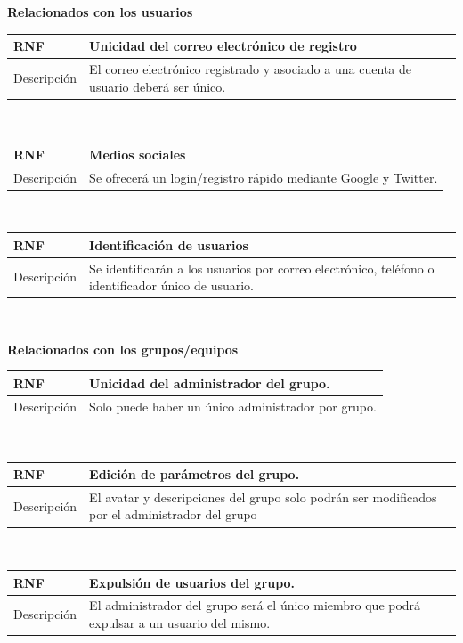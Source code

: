 \documentclass[twoside]{report}
\newcommand\addrow[2]{#1 &#2\\ }
\newcommand\addheading[2]{#1 &#2\\ \hline}
\newcommand\tabularhead{\begin{tabular}{lp{0.7\textwidth}}
\hline
}
\newenvironment{req}{\tabularhead}
{\hline\end{tabular}}
\begin{document}
\textbf{Relacionados con los usuarios}\\

\begin{req}
	\addheading{\textbf{RNF\arabic{nonFunctionalRequirements}}}{Unicidad del correo electrónico de registro}
	\addrow{Descripción}{El correo electrónico registrado y asociado a una cuenta de usuario deberá ser único.}
\end{req}\\

\begin{req}
	\addheading{\textbf{RNF\arabic{nonFunctionalRequirements}}}{Medios sociales}
	\addrow{Descripción}{Se ofrecerá un login/registro rápido mediante Google y Twitter.}
\end{req}\\

\begin{req}
	\addheading{\textbf{RNF\arabic{nonFunctionalRequirements}}}{Identificación de usuarios}
	\addrow{Descripción}{Se identificarán a los usuarios por correo electrónico, teléfono o identificador único de usuario.}
\end{req}\\

\textbf{Relacionados con los grupos/equipos}\\

\begin{req}
	\addheading{\textbf{RNF\arabic{nonFunctionalRequirements}}}{Unicidad del administrador del grupo.}
	\addrow{Descripción}{Solo puede haber un único administrador por grupo.}
\end{req}\\

\begin{req}
	\addheading{\textbf{RNF\arabic{nonFunctionalRequirements}}}{Edición de parámetros del grupo.}
	\addrow{Descripción}{El avatar y descripciones del grupo solo podrán ser modificados por el administrador del grupo}
\end{req}\\

\begin{req}
	\addheading{\textbf{RNF\arabic{nonFunctionalRequirements}}}{Expulsión de usuarios del grupo.}
	\addrow{Descripción}{El administrador del grupo será el único miembro que podrá expulsar a un usuario del mismo.}
\end{req}\\
\end{document}
